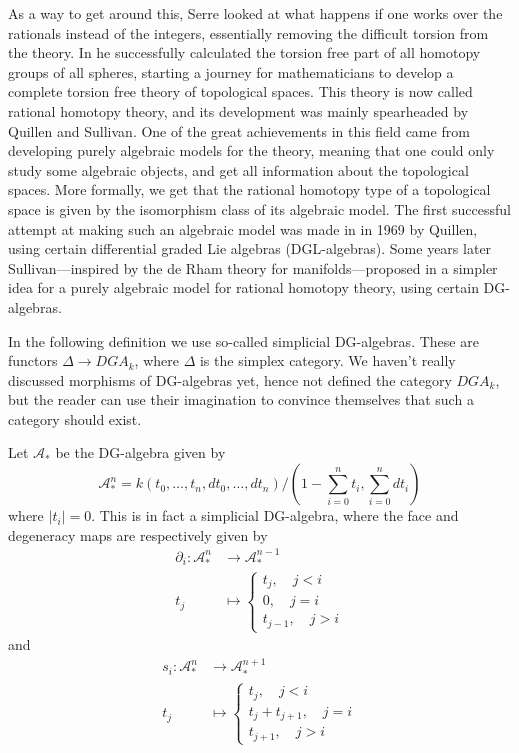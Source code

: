 As a way to get around this, Serre looked at what happens if one works over the rationals instead of the integers, essentially removing the difficult torsion from the theory. In \cite{Serre} he successfully calculated the torsion free part of all homotopy groups of all spheres, starting a journey for mathematicians to develop a complete torsion free theory of topological spaces. This theory is now called rational homotopy theory, and its development was mainly spearheaded by Quillen and Sullivan. One of the great achievements in this field came from developing purely algebraic models for the theory, meaning that one could only study some algebraic objects, and get all information about the topological spaces. More formally, we get that the rational homotopy type of a topological space is given by the isomorphism class of its algebraic model. The first successful attempt at making such an algebraic model was made in \cite{Quillen} in 1969 by Quillen, using certain differential graded Lie algebras (DGL-algebras). Some years later Sullivan---inspired by the de Rham theory for manifolds---proposed in \cite{Sullivan} a simpler idea for a purely algebraic model for rational homotopy theory, using certain DG-algebras. 

In the following definition we use so-called simplicial DG-algebras. These are functors $\Delta \longrightarrow DGA_k$, where $\Delta$ is the simplex category. We haven't really discussed morphisms of DG-algebras yet, hence not defined the category $DGA_k$, but the reader can use their imagination to convince themselves that such a category should exist. 

\begin{definition}
Let $\mathcal{A}_*$ be the DG-algebra given by 
\begin{equation*}
    \mathcal{A}^n_* = k(t_0, \ldots, t_n, dt_0, \ldots, dt_n)/(1-\sum_{i=0}^n t_i, \sum_{i=0}^n dt_i) 
\end{equation*}
where $|t_i|=0$. This is in fact a simplicial DG-algebra, where the face and degeneracy maps are respectively given by 
\begin{align*}
    \partial_i\colon \mathcal{A}_*^n &\longrightarrow\mathcal{A}_*^{n-1} \\
    t_j&\longmapsto
    \begin{cases}
        t_j, \quad j<i \\
        0, \quad j=i \\
        t_{j-1}, \quad j>i
    \end{cases}
\end{align*}
and 
\begin{align*}
    s_i\colon \mathcal{A}_*^n &\longrightarrow\mathcal{A}_*^{n+1} \\
    t_j&\longmapsto
    \begin{cases}
        t_j, \quad j<i \\
        t_j+t_{j+1}, \quad j=i \\
        t_{j+1}, \quad j>i
    \end{cases}
\end{align*}
\end{definition}

